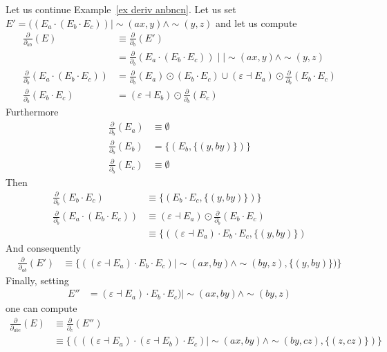 \documentclass[a4paper]{llncs}
\begin{document}
  \begin{example}\label{ex deriv anbncn abc}
    Let us continue Example~\ref{ex deriv anbncn}.
    Let us set $E'=((E_a\cdot (E_b \cdot E_c))\mid \sim(ax,y)\wedge \sim (y,z)$ and let us compute 
    \begin{align*}
      \frac{\partial}{\partial_{ab}}(E)&\equiv \frac{\partial}{\partial_b}(E')\\
      &=\frac{\partial}{\partial_b}(E_a\cdot (E_b \cdot E_c)) \mid\mid \sim(ax,y)\wedge \sim (y,z)\\
      \frac{\partial}{\partial_b}(E_a\cdot (E_b \cdot E_c))&=
        \frac{\partial}{\partial_b}(E_a)\odot (E_b \cdot E_c)
        \cup
        (\varepsilon\dashv E_a)\odot \frac{\partial}{\partial_b}(E_b\cdot E_c)\\
        \frac{\partial}{\partial_b}(E_b\cdot E_c) &= 
        (\varepsilon\dashv E_b)\odot \frac{\partial}{\partial_b}(E_c)
    \end{align*}
    Furthermore
    \begin{align*}
      \frac{\partial}{\partial_b}(E_a) &\equiv \emptyset\\
      \frac{\partial}{\partial_b}(E_b) &=\{(E_b,\{(y,by)\})\}\\
      \frac{\partial}{\partial_b}(E_c) &\equiv \emptyset
    \end{align*}
    Then
    \begin{align*}
      \frac{\partial}{\partial_b}(E_b\cdot E_c)&\equiv \{(E_b\cdot E_c,\{(y,by)\})\}\\
      \frac{\partial}{\partial_b}(E_a\cdot (E_b \cdot E_c))&\equiv(\varepsilon\dashv E_a)\odot \frac{\partial}{\partial_b}(E_b\cdot E_c)\\
      &\equiv \{ ((\varepsilon\dashv E_a)\cdot E_b\cdot E_c,\{(y,by)\})
    \end{align*}
    And consequently
    \begin{align*}
      \frac{\partial}{\partial_{ab}}(E')&\equiv \{((\varepsilon\dashv E_a)\cdot E_b \cdot E_c)\mid \sim(ax,by)\wedge \sim (by,z),\{(y,by)\})\}
    \end{align*}
    Finally, setting
    \begin{align*}
      E''&=(\varepsilon\dashv E_a)\cdot E_b \cdot E_c)\mid \sim(ax,by)\wedge \sim (by,z)
    \end{align*}
    one can compute
    \begin{align*}
      \frac{\partial}{\partial_{abc}}(E)& \equiv \frac{\partial}{\partial_{c}}(E'')\\
      & \equiv \{(((\varepsilon\dashv E_a)\cdot (\varepsilon\dashv E_b) \cdot E_c)\mid \sim(ax,by)\wedge \sim (by,cz),\{(z,cz)\})\}
    \end{align*}
  \end{example}
  
\end{document}
